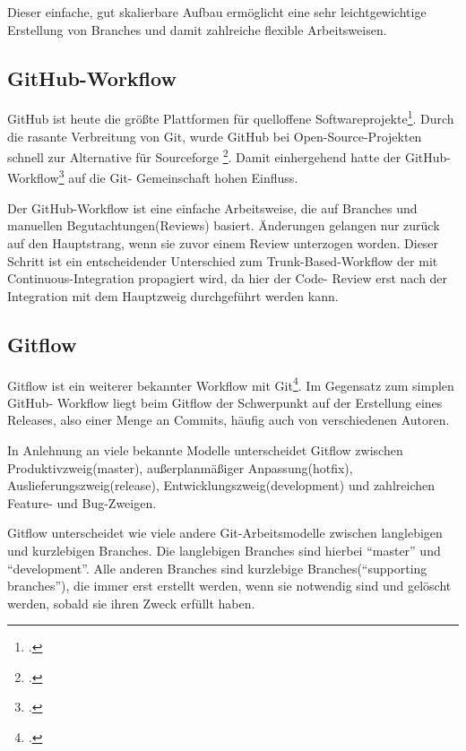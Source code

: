 Dieser einfache, gut skalierbare Aufbau ermöglicht eine sehr leichtgewichtige Erstellung von Branches und damit 
zahlreiche flexible Arbeitsweisen.

\subsection{GitHub-Workflow}

GitHub ist heute die größte Plattformen für quelloffene Softwareprojekte\footcite{github-marketshare-datanyze}. Durch die 
rasante Verbreitung von Git, wurde GitHub bei Open-Source-Projekten schnell zur Alternative für Sourceforge
\footcite{heise-github-2011}. Damit einhergehend hatte der GitHub-Workflow\footcite{github-workflow-intro} auf die Git-
Gemeinschaft hohen Einfluss.

Der GitHub-Workflow ist eine einfache Arbeitsweise, die auf Branches und manuellen Begutachtungen(Reviews) basiert. 
Änderungen gelangen nur zurück auf den Hauptstrang, wenn sie zuvor einem Review unterzogen worden. Dieser Schritt ist ein 
entscheidender Unterschied zum Trunk-Based-Workflow der mit Continuous-Integration propagiert wird, da hier der Code-
Review erst nach der Integration mit dem Hauptzweig durchgeführt werden kann.

\subsection{Gitflow}

Gitflow ist ein weiterer bekannter Workflow mit Git\footcite{nvie-git-branch-model}. Im Gegensatz zum simplen GitHub-
Workflow liegt beim Gitflow der Schwerpunkt auf der Erstellung eines Releases, also einer Menge an Commits, häufig auch
von verschiedenen Autoren.

In Anlehnung an viele bekannte Modelle unterscheidet Gitflow zwischen Produktivzweig(master), außerplanmäßiger 
Anpassung(hotfix), Auslieferungszweig(release), Entwicklungszweig(development) und zahlreichen Feature- und Bug-Zweigen.

Gitflow unterscheidet wie viele andere Git-Arbeitsmodelle zwischen langlebigen und kurzlebigen Branches. Die langlebigen 
Branches sind hierbei ``master'' und ``development''. Alle anderen Branches sind kurzlebige Branches(``supporting 
branches''), die immer erst erstellt werden, wenn sie notwendig sind und gelöscht werden, sobald sie ihren Zweck erfüllt 
haben.

